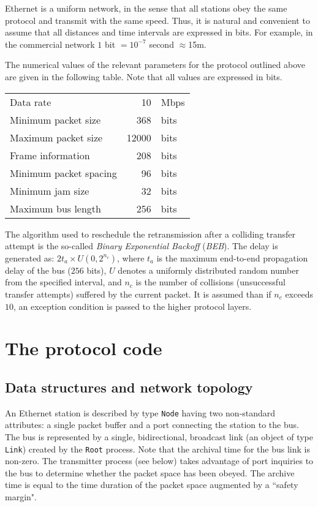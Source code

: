 Ethernet is a uniform network, in the sense that all stations obey the
same protocol and transmit with the same speed.
Thus, it is natural and convenient to assume that all distances and time
intervals are expressed in bits.
For example, in the commercial network $1$ bit $= 10^{-7}$
second $\approx $15m.

The numerical values of the relevant parameters for the protocol outlined above
are given in the following table.
Note that all values are expressed in bits.

\medskip

\begin{center}
\begin{tabular}{|lr@{\ }l|}
\hline 
Data rate		& 10	&Mbps\\
Minimum packet size	& 368	&bits\\
Maximum packet size	& 12000 &bits\\
Frame information	& 208 	&bits\\
Minimum packet spacing	& 96 	&bits\\
Minimum jam size	& 32 	&bits\\
Maximum bus length	& 256 	&bits\\ \hline
\end{tabular}
\end{center}

\medskip

The algorithm used to reschedule the retransmission after a colliding transfer
attempt is the so-called {\em Binary Exponential Backoff\/} ({\em BEB\/}). The
delay is generated as:
$2t_a \times U(0,2^{n_c} )$,
where $t_a$ is the maximum end-to-end propagation delay of the bus ($256$ bits),
$U$ denotes a uniformly distributed random number from the specified
interval, and $n_c$ is the number of collisions (unsuccessful transfer
attempts) suffered by the current packet.
It is assumed than if $n_c$ exceeds $10$, an exception condition is passed to
the higher protocol layers.

\section{The protocol code}

\subsection{Data structures and network topology}

An Ethernet station is described by type {\tt Node} having two non-standard
attributes: a single packet buffer and a port connecting the station to the
bus.
The bus is represented by a single, bidirectional, broadcast link
(an object of type {\tt Link}) created by the {\tt Root}
process.
Note that the archival time for the bus link is non-zero.
The transmitter process (see below) takes advantage of port inquiries to
the bus to determine whether the packet space has been obeyed.
The archive time is equal to the time duration of the packet space augmented
by a ``safety margin".

